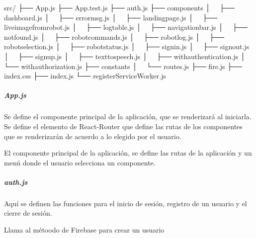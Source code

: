 %
\begin{sphinxVerbatim}[commandchars=\\\{\}]
src/
├── App.js
├── App.test.js
├── auth.js
├── components
│   ├── dashboard.js
│   ├── error\PYGZus{}msg.js
│   ├── landing\PYGZus{}page.js
│   ├── live\PYGZus{}image\PYGZus{}from\PYGZus{}robot.js
│   ├── log\PYGZus{}table.js
│   ├── navigation\PYGZus{}bar.js
│   ├── not\PYGZus{}found.js
│   ├── robot\PYGZus{}commands.js
│   ├── robot\PYGZus{}log.js
│   ├── robot\PYGZus{}selection.js
│   ├── robot\PYGZus{}status.js
│   ├── signin.js
│   ├── signout.js
│   ├── signup.js
│   ├── text\PYGZus{}to\PYGZus{}speech.js
│   ├── with\PYGZus{}authentication.js
│   └── with\PYGZus{}authorization.js
├── constants
│   └── routes.js
├── fire.js
├── index.css
├── index.js
└── registerServiceWorker.js
\end{sphinxVerbatim}


\subparagraph{App.js}
\label{\detokenize{code_docs:app-js}}
Se define el componente principal de la aplicación, que se renderizará
al iniciarla. Se define el elemento  de React-Router
que define las rutas de los componentes que se renderizarán de acuerdo a lo
elegido por el usuario.

\begin{fulllineitems}
\label{\detokenize{code_docs:App}}
El componente principal de la aplicación, se define las rutas de la aplicación
y un menú donde el usuario selecciona un componente.

\end{fulllineitems}



\subparagraph{auth.js}
\label{\detokenize{code_docs:auth-js}}
Aquí se definen las funciones para el inicio de sesión, registro de un usuario
y el cierre de sesión.

\begin{fulllineitems}
\label{\detokenize{code_docs:doCreateUserWithEmailAndPassword}}
Llama al métoodo  de Firebase para crear un usuario

\end{fulllineitems}


